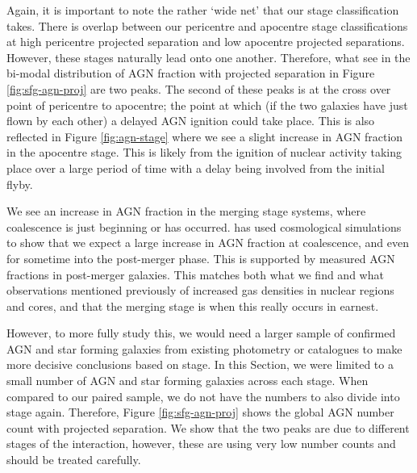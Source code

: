 Again, it is important to note the rather `wide net' that our stage classification takes. There is overlap between our pericentre and apocentre stage classifications at high pericentre projected separation and low apocentre projected separations. However, these stages naturally lead onto one another. Therefore, what see in the bi-modal distribution of AGN fraction with projected separation in Figure \ref{fig:sfg-agn-proj} are two peaks. The second of these peaks is at the cross over point of pericentre to apocentre; the point at which (if the two galaxies have just flown by each other) a delayed AGN ignition could take place. This is also reflected in Figure \ref{fig:agn-stage} where we see a slight increase in AGN fraction in the apocentre stage. This is likely from the ignition of nuclear activity taking place over a large period of time with a delay being involved from the initial flyby.

We see an increase in AGN fraction in the merging stage systems, where coalescence is just beginning or has occurred. \citet{2023MNRAS.519.4966B} has used cosmological simulations to show that we expect a large increase in AGN fraction at coalescence, and even for sometime into the post-merger phase. This is supported by measured AGN fractions in post-merger galaxies. This matches both what we find and what observations mentioned previously of increased gas densities in nuclear regions and cores, and that the merging stage is when this really occurs in earnest.

However, to more fully study this, we would need a larger sample of confirmed AGN and star forming galaxies from existing photometry or catalogues to make more decisive conclusions based on stage. In this Section, we were limited to a small number of AGN and star forming galaxies across each stage. When compared to our paired sample, we do not have the numbers to also divide into stage again. Therefore, Figure \ref{fig:sfg-agn-proj} shows the global AGN number count with projected separation. We show that the two peaks are due to different stages of the interaction, however, these are using very low number counts and should be treated carefully.


